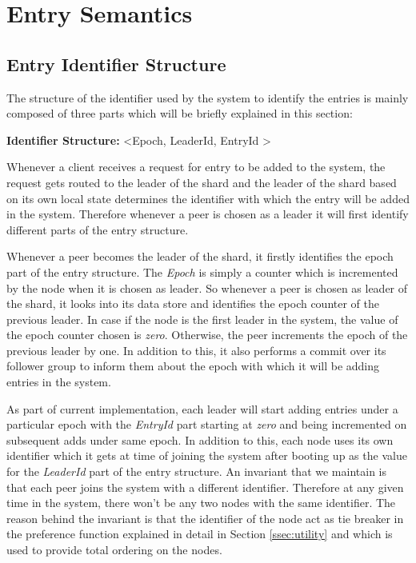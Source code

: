 \documentclass[12pt,a4paper,twoside,openright]{book}
\begin{document}
\section{Entry Semantics}

\subsection{Entry Identifier Structure}
\label{ssec:entryIdStructure}
The structure of the identifier used by the system to identify the entries is mainly composed of three parts which will be briefly explained in this section:

\begin{tcolorbox}
\textbf{Identifier Structure:} \textless Epoch, LeaderId, EntryId \textgreater
\end{tcolorbox}

Whenever a client receives a request for entry to be added to the system, the request gets routed to the leader of the shard and the leader of the shard based on its own local state determines the identifier with which the entry will be added in the system. Therefore whenever a peer is chosen as a leader it will first identify different parts of the entry structure. 
\par Whenever a peer becomes the leader of the shard, it firstly identifies the epoch part of the entry structure. The \textit{Epoch} is simply a counter which is incremented by the node when it is chosen as leader. So whenever a peer is chosen as leader of the shard, it looks into its data store and identifies the epoch counter of the previous leader. In case if the node is the first leader in the system, the value of the epoch counter chosen is \textit{zero}. Otherwise, the peer increments the epoch of the previous leader by one. In addition to this, it also performs a commit over its follower group to inform them about the epoch with which it will be adding entries in the system. 
\par As part of current implementation, each leader will start adding entries under a particular epoch with the \textit{EntryId} part starting at \textit{zero} and being incremented on subsequent adds under same epoch. In addition to this, each node uses its own identifier which it gets at time of joining the system after booting up as the value for the \textit{LeaderId} part of the entry structure.  An invariant that we maintain is that each peer joins the system with a different identifier. Therefore at any given time in the system, there won't be any two nodes with the same  identifier. The reason behind the invariant is that the identifier of the node act as tie breaker in the preference function explained in detail in Section \ref{ssec:utility} and which is used to provide total ordering on the nodes. 
\end{document}
